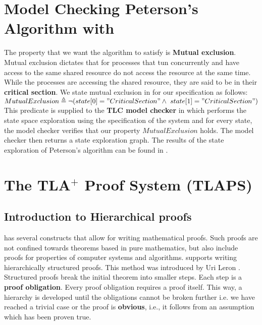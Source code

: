 \documentclass[fleqn]{tukseminar}
\begin{document}
			\section{Model Checking Peterson's Algorithm with \tla}
			
			The property that we want the algorithm to satisfy is \textbf{Mutual exclusion}. Mutual exclusion dictates that for processes that tun concurrently and have access to the same shared resource do not access the resource at the same time. While the processes are accessing the shared resource, they are said to be in their \textbf{critical section}. We state mutual exclusion in \tla for our specification as follows:\\
			
			$MutualExclusion \triangleq \lnot(state[0] = "CriticalSection" \land \  state[1] = "CriticalSection")$\\
			
			This predicate is supplied to the \textbf{TLC model checker}\cite{tlc} in \tla which performs the state space exploration using the specification of the system and for every state, the model checker verifies that our property $MutualExclusion$ holds. The model checker then returns a state exploration graph. The results of the state exploration of Peterson's algorithm can be found in . 
			
			\section{The TLA$^{+} $ Proof System (TLAPS)}
			\label{sec:tlaps}
			\subsection{Introduction to Hierarchical proofs}
			\tla has several constructs that allow for writing mathematical proofs. Such proofs are not confined towards theorems based in pure mathematics, but also include proofs for properties of computer systems and algorithms. \tla supports writing hierarchically structured proofs. This method was introduced by Uri Leron \cite{leron}. Structured proofs break the initial theorem into smaller steps. Each step is a \textbf{proof obligation}. Every proof obligation requires a proof itself. This way, a hierarchy is developed until the obligations cannot be broken further i.e. we have reached a trivial case or the proof is \textbf{obvious}, i.e., it follows from an assumption which has been proven true.
			
\end{document}
